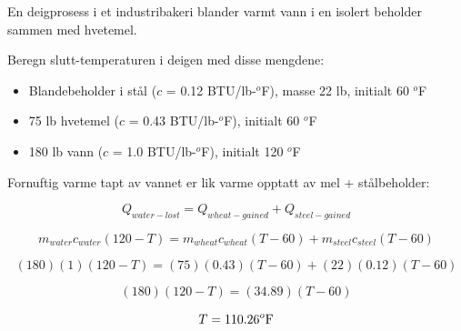

En deigprosess i et industribakeri blander varmt vann i en isolert beholder sammen med hvetemel.

\vskip 10pt

Beregn slutt-temperaturen i deigen med disse mengdene:

\begin{itemize}
\item{} Blandebeholder i stål ($c$ = 0.12 BTU/lb-$^{o}$F), masse 22 lb, initialt 60 $^{o}$F
\vskip 10pt
\item{} 75 lb hvetemel ($c$ = 0.43 BTU/lb-$^{o}$F), initialt 60 $^{o}$F
\vskip 10pt
\item{} 180 lb vann ($c$ = 1.0 BTU/lb-$^{o}$F), initialt 120 $^{o}$F
\end{itemize}







Fornuftig varme tapt av vannet er lik varme opptatt av mel + stålbeholder:

$$Q_{water-lost} = Q_{wheat-gained} + Q_{steel-gained}$$

$$m_{water}c_{water} (120 - T) = m_{wheat}c_{wheat} (T - 60) + m_{steel}c_{steel} (T - 60)$$

$$(180)(1)(120 - T) = (75)(0.43)(T - 60) + (22)(0.12)(T - 60)$$

$$(180)(120 - T) = (34.89)(T - 60)$$

$$T = 110.26^o \hbox{F}$$










